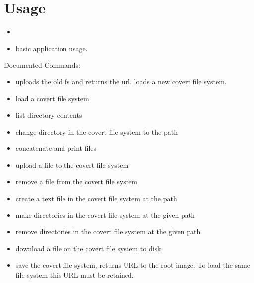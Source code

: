 \documentclass[letterpaper,10pt,english]{sphinxmanual}
\begin{document}
\chapter{Usage}
\label{index:usage}\begin{itemize}
\item {} 
 \footnotemark[1]

\item {} 
 basic application usage.

\end{itemize}

Documented Commands:
\begin{itemize}
\item {} 
 uploads the old fs and returns the url. loads a new covert file system.

\item {} 
 load a covert file system

\item {} 
 \footnotemark[1] list directory contents

\item {} 
 change directory in the covert file system to the path

\item {} 
 concatenate and print files

\item {} 
 upload a file to the covert file system

\item {} 
 remove a file from the covert file system

\item {} 
 create a text file in the covert file system at the path

\item {} 
 make directories in the covert file system at the given path

\item {} 
 remove directories in the covert file system at the given path

\item {} 
 download a file on the covert file system to disk

\item {} 
 save the covert file system, returns URL to the root image. To load the same file system this URL must be retained.


\end{itemize}
\end{document}
